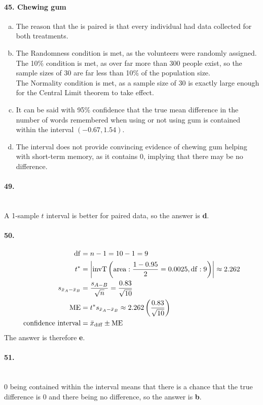\documentclass[../Homework]{subfiles}
\begin{document}
			\paragraph{45. Chewing gum}
				\begin{enumerate}[a.]
					\item
						The reason that the is paired is that every individual had data collected for both treatments.
					\item
						The Randomness condition is met, as the volunteers were randomly assigned. \\
						The 10\% condition is met, as over far more than 300 people exist, so the sample sizes of 30 are far less than 10\% of the population size. \\
						The Normality condition is met, as a sample size of 30 is exactly large enough for the Central Limit theorem to take effect.
					\item
						It can be said with 95\% confidence that the true mean difference in the number of words remembered when using or not using gum is contained within the interval $(-0.67, 1.54)$.
					\item
						The interval does not provide convincing evidence of chewing gum helping with short-term memory, as it contains 0, implying that there may be no difference.
				\end{enumerate}
			\paragraph{49.}\ \\
				A 1-sample $t$ interval is better for paired data, so the answer is \textbf{d}.
			\paragraph{50.}
				\begin{align*}
					\operatorname{df} &= n - 1 = 10 - 1 = 9 \\
					t^* &= \left|\operatorname{invT}\left(\operatorname{area}: \frac{1 - 0.95}{2} = 0.0025, \operatorname{df}: 9\right)\right| \approx 2.262 \\
					s_{\bar{x}_A - \bar{x}_B} &= \frac{s_{A - B}}{\sqrt{n}} = \frac{0.83}{\sqrt{10}} \\
					\operatorname{ME} &= t^*s_{\bar{x}_A - \bar{x}_B} \approx 2.262\left(\frac{0.83}{\sqrt{10}}\right) \\
					\text{confidence interval} &= \bar{x}_{\mathrm{diff}} \pm \operatorname{ME}
				\end{align*}
				The answer is therefore \textbf{e}.
			\paragraph{51.}\ \\
			0 being contained within the interval means that there is a chance that the true difference is 0 and there being no difference, so the answer is \textbf{b}.
\end{document}
